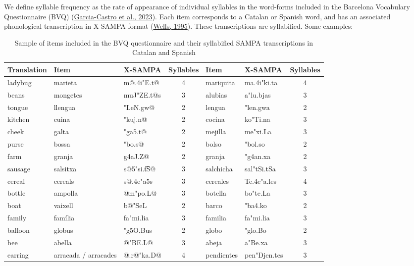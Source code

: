 \documentclass[
]{article}
\begin{document}
We define syllable frequency as the rate of appearance of individual
syllables in the word-forms included in the Barcelona Vocabulary
Questionnaire (BVQ)
(\protect\hyperlink{ref-garcia-castro2023bvq}{Garcia-Castro et al.,
2023}). Each item corresponds to a Catalan or Spanish word, and has an
associated phonological transcription in X-SAMPA format
(\protect\hyperlink{ref-wells1995computercoding}{Wells, 1995}). These
transcriptions are syllabified. Some examples:

\hypertarget{tbl-syll-items}{}
\begin{table}
\caption{\label{tbl-syll-items}Sample of items included in the BVQ questionnaire and their syllabified
SAMPA transcriptions in Catalan and Spanish }\tabularnewline

\centering
\begin{tabular}{lllcllc}
\toprule
Translation & Item & X-SAMPA & Syllables & Item & X-SAMPA & Syllables\\
\midrule
ladybug & marieta & m@.4i"E.t@ & 4 & mariquita & ma.4i"ki.ta & 4\\
beans & mongetes & muJ"ZE.t@s & 3 & alubias & a"lu.bjas & 3\\
tongue & llengua & "LeN.gw@ & 2 & lengua & "len.gwa & 2\\
kitchen & cuina & "kuj.n@ & 2 & cocina & ko"Ti.na & 3\\
cheek & galta & "ga5.t@ & 2 & mejilla & me"xi.La & 3\\
\addlinespace
purse & bossa & "bo.s@ & 2 & bolso & "bol.so & 2\\
farm & granja & g4aJ.Z@ & 2 & granja & "g4an.xa & 2\\
sausage & salsitxa & s@5"si.t͡S@ & 3 & salchicha & sal"tSi.tSa & 3\\
cereal & cereals & s@.4e"a5s & 3 & cereales & Te.4e"a.les & 4\\
bottle & ampolla & @m"po.L@ & 3 & botella & bo"te.La & 3\\
\addlinespace
boat & vaixell & b@"SeL & 2 & barco & "ba4.ko & 2\\
family & família & fa"mi.lia & 3 & familia & fa"mi.lia & 3\\
balloon & globus & "g5O.Bus & 2 & globo & "glo.Bo & 2\\
bee & abella & @"BE.L@ & 3 & abeja & a"Be.xa & 3\\
earring & arracada / arracades & @.r@"ka.D@ & 4 & pendientes & pen"Djen.tes & 3\\
\bottomrule
\end{tabular}
\end{table}
\end{document}
